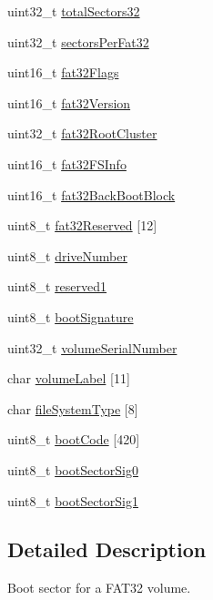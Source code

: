 \begin{DoxyCompactItemize}
\item 
uint32\+\_\+t \hyperlink{structfat32__boot_ab79466016103c2762c6b057dd458d434}{total\+Sectors32}
\item 
uint32\+\_\+t \hyperlink{structfat32__boot_aa00db084ff2f7e25febef321469adeb9}{sectors\+Per\+Fat32}
\item 
uint16\+\_\+t \hyperlink{structfat32__boot_aaa31a140202021bf33aed72765531b3f}{fat32\+Flags}
\item 
uint16\+\_\+t \hyperlink{structfat32__boot_a29c37e1163772493efb524c5ca0e1aa8}{fat32\+Version}
\item 
uint32\+\_\+t \hyperlink{structfat32__boot_aa216677f22a95dd86ed2e61604883a13}{fat32\+Root\+Cluster}
\item 
uint16\+\_\+t \hyperlink{structfat32__boot_a03ff6d1197c08688f20c7aad40206bc4}{fat32\+F\+S\+Info}
\item 
uint16\+\_\+t \hyperlink{structfat32__boot_ac93acdae62dab5cd1f7a35187992dbf2}{fat32\+Back\+Boot\+Block}
\item 
uint8\+\_\+t \hyperlink{structfat32__boot_a3343ad07c664fb7564d68c5194ea7da9}{fat32\+Reserved} \mbox{[}12\mbox{]}
\item 
uint8\+\_\+t \hyperlink{structfat32__boot_aca415c1a6eb1c242d460a6d0ffa9ebec}{drive\+Number}
\item 
uint8\+\_\+t \hyperlink{structfat32__boot_a7075c3c00aae071110fd1acb2e6fd599}{reserved1}
\item 
uint8\+\_\+t \hyperlink{structfat32__boot_ab79a1205277ecab05526fb0bac6e42f6}{boot\+Signature}
\item 
uint32\+\_\+t \hyperlink{structfat32__boot_a20768678da224faefd8acf12cabdbfb8}{volume\+Serial\+Number}
\item 
char \hyperlink{structfat32__boot_a8e6349f46344145a7320637a58107b3b}{volume\+Label} \mbox{[}11\mbox{]}
\item 
char \hyperlink{structfat32__boot_a13ee6c63e17d634b6826bfdfa94cbd78}{file\+System\+Type} \mbox{[}8\mbox{]}
\item 
uint8\+\_\+t \hyperlink{structfat32__boot_a7a74880066860140386edf3d9278b9f7}{boot\+Code} \mbox{[}420\mbox{]}
\item 
uint8\+\_\+t \hyperlink{structfat32__boot_a1cb46a5427b641a6017a082bc56df1be}{boot\+Sector\+Sig0}
\item 
uint8\+\_\+t \hyperlink{structfat32__boot_a53bc302a398f02a86d3b28f25a5ec8e2}{boot\+Sector\+Sig1}
\end{DoxyCompactItemize}


\subsection{Detailed Description}
Boot sector for a F\+A\+T32 volume. 

